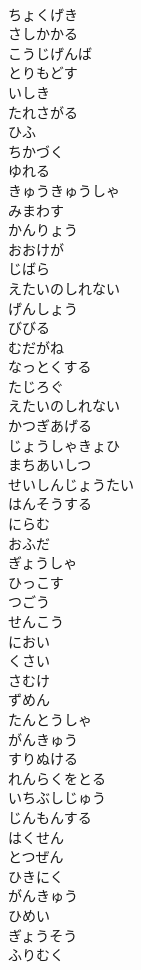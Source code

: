 \documentclass[8pt]{extreport}
\begin{document}
\begin{CJK}{UTF8}{min}
\\	ちょくげき
\\	さしかかる
\\	こうじげんば
\\	とりもどす
\\	いしき
\\	たれさがる
\\	ひふ
\\	ちかづく
\\	ゆれる
\\	きゅうきゅうしゃ
\\	みまわす
\\	かんりょう
\\	おおけが
\\	じばら
\\	えたいのしれない
\\	げんしょう
\\	びびる
\\	むだがね
\\	なっとくする
\\	たじろぐ
\\	えたいのしれない
\\	かつぎあげる
\\	じょうしゃきょひ
\\	まちあいしつ
\\	せいしんじょうたい
\\	はんそうする
\\	にらむ
\\	おふだ
\\	ぎょうしゃ
\\	ひっこす
\\	つごう
\\	せんこう
\\	におい
\\	くさい
\\	さむけ
\\	ずめん
\\	たんとうしゃ
\\	がんきゅう
\\	すりぬける
\\	れんらくをとる
\\	いちぶしじゅう
\\	じんもんする
\\	はくせん
\\	とつぜん
\\	ひきにく
\\	がんきゅう
\\	ひめい
\\	ぎょうそう
\\	ふりむく

\end{CJK}
\end{document}
